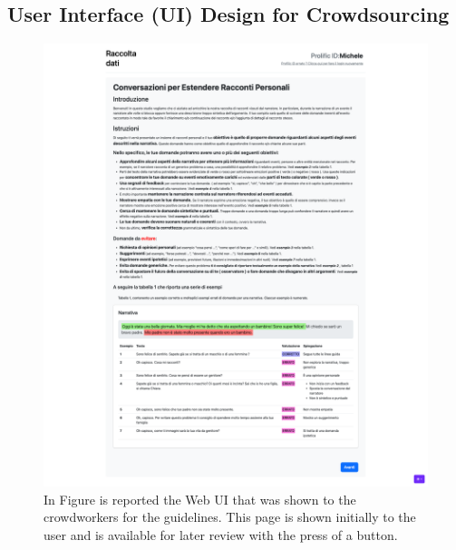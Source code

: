 \subsection{User Interface (UI) Design for Crowdsourcing}
\begin{figure}[!htbp]
    \centering
    \includegraphics[width=1\linewidth]{assets//imgs/UI-guidelines.png}
    \caption{In Figure is reported the Web UI that was shown to the crowdworkers for the guidelines. This page is shown initially to the user and is available for later review with the press of a button.}
    \label{fig:data_collection_web:1}
\end{figure}

